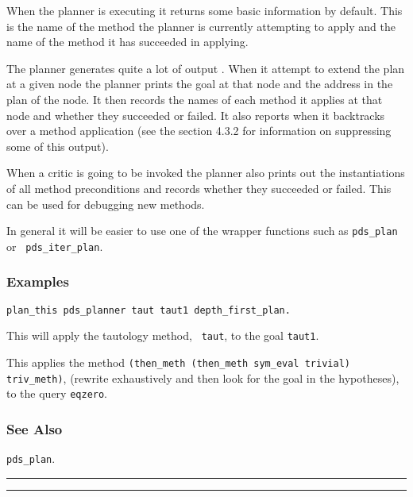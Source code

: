 When the planner is executing it returns some basic information by
default.  This is the name of the method the planner is currently
attempting to apply and the name of the method it has succeeded in
applying.

The planner generates quite a lot of output .  When it attempt to extend the plan at a given
node the planner prints the goal at that
node and the address in the plan of the node.  It
then records the names of each method it applies at that node and
whether they succeeded or failed.  It also reports when it backtracks
over a method application (see the section 4.3.2 for information on
suppressing some of this output).

When a critic is going to be invoked the planner also
prints out the instantiations of all method
preconditions and records whether they
succeeded or failed.  This can be used for debugging new methods.

In general it will be easier to use one of the wrapper functions such
as {\tt pds\_plan} or {\tt
  pds\_iter\_plan}.

\subsubsection*{Examples}
{\tt plan\_this pds\_planner taut taut1 depth\_first\_plan.} 

\noindent This will apply the tautology method, {\tt
  taut}, to the goal {\tt taut1}.


\noindent This applies the method {\tt  (then\_meth (then\_meth sym\_eval
  trivial)
  triv\_meth)},
(rewrite exhaustively and then look for the goal in the hypotheses),
to the query {\tt eqzero}. \\


\subsubsection*{See Also}
{\tt pds\_plan}. \\

\vspace{2mm}
\hrule
\vspace{2mm}
\begin{Large}
\end{Large}
\vspace{2mm}
\hrule
\vspace{2mm}

